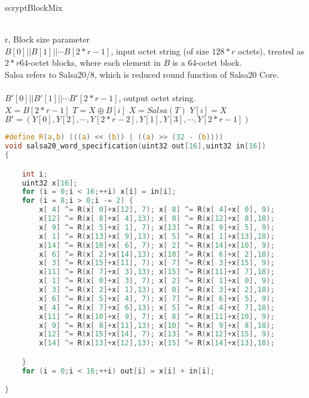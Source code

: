 \begin{algorithm}[tbp]\footnotesize
\caption{scryptBlockMix}
  	\begin{algorithmic}[1]
	    \REQUIRE ~~\\ 
	     r, Block size parameter\\
 		$B[0]||B[1]||\cdots B[2*r-1]$, input octet string (of size $128 * r$ octets), 
 		treated as $2 * r 64$-octet blocks, where each element in $B$ is a 64-octet block.\\
 		Salsa refers to Salsa20/8, which is reduced round function of Salsa20 Core.\\
	    \ENSURE ~~\\
	    $B'[0]||B'[1]||\cdots B'[2*r-1]$, output octet string.\\
	    \STATE $X = B[2*r-1]$
			\STATE $T=X \oplus B[i]$  
			\STATE $X=Salsa(T)$  
			\STATE $Y[i]=X$
		\ENDFOR 
		\RETURN $B'=(Y[0],Y[2],\cdots,Y[2*r-2],Y[1],Y[3],\cdots, Y[2*r-1])$
    \end{algorithmic}
\end{algorithm}

\begin{lstlisting}[language = c, caption = Salsa20/8, label=lst-salsa20core]
#define R(a,b) (((a) << (b)) | ((a) >> (32 - (b)))) 
void salsa20_word_specification(uint32 out[16],uint32 in[16]) 
{

	int i; 
	uint32 x[16]; 
	for (i = 0;i < 16;++i) x[i] = in[i]; 
	for (i = 8;i > 0;i -= 2) { 
		x[ 4] ^= R(x[ 0]+x[12], 7); x[ 8] ^= R(x[ 4]+x[ 0], 9);
		x[12] ^= R(x[ 8]+x[ 4],13); x[ 0] ^= R(x[12]+x[ 8],18); 
		x[ 9] ^= R(x[ 5]+x[ 1], 7); x[13] ^= R(x[ 9]+x[ 5], 9); 
		x[ 1] ^= R(x[13]+x[ 9],13); x[ 5] ^= R(x[ 1]+x[13],18); 
		x[14] ^= R(x[10]+x[ 6], 7); x[ 2] ^= R(x[14]+x[10], 9); 
		x[ 6] ^= R(x[ 2]+x[14],13); x[10] ^= R(x[ 6]+x[ 2],18); 
		x[ 3] ^= R(x[15]+x[11], 7); x[ 7] ^= R(x[ 3]+x[15], 9); 
		x[11] ^= R(x[ 7]+x[ 3],13); x[15] ^= R(x[11]+x[ 7],18); 
		x[ 1] ^= R(x[ 0]+x[ 3], 7); x[ 2] ^= R(x[ 1]+x[ 0], 9); 
		x[ 3] ^= R(x[ 2]+x[ 1],13); x[ 0] ^= R(x[ 3]+x[ 2],18); 
		x[ 6] ^= R(x[ 5]+x[ 4], 7); x[ 7] ^= R(x[ 6]+x[ 5], 9); 
		x[ 4] ^= R(x[ 7]+x[ 6],13); x[ 5] ^= R(x[ 4]+x[ 7],18); 
		x[11] ^= R(x[10]+x[ 9], 7); x[ 8] ^= R(x[11]+x[10], 9); 
		x[ 9] ^= R(x[ 8]+x[11],13); x[10] ^= R(x[ 9]+x[ 8],18); 
		x[12] ^= R(x[15]+x[14], 7); x[13] ^= R(x[12]+x[15], 9); 
		x[14] ^= R(x[13]+x[12],13); x[15] ^= R(x[14]+x[13],18);

	}
 	for (i = 0;i < 16;++i) out[i] = x[i] + in[i];

}
\end{lstlisting}

